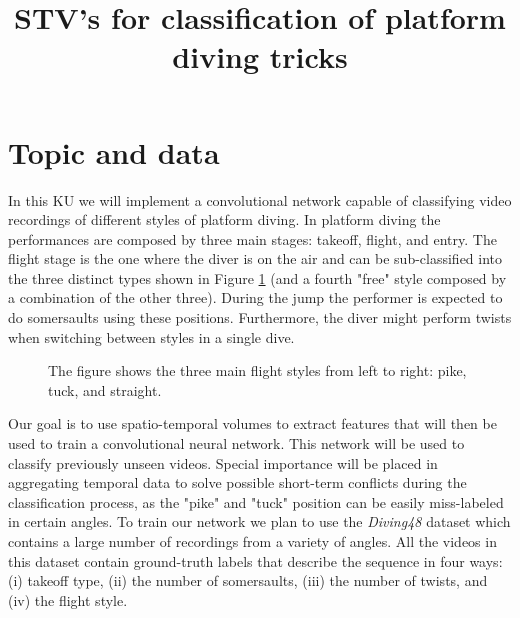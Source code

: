 \documentclass[10pt]{article}
\begin{document}
\noindent



\title{STV's for classification of platform diving tricks}


\maketitle

\section{Topic and data}

In this KU we will implement a convolutional network capable of classifying video recordings of different styles of platform diving. In platform diving the performances are composed by three main stages: takeoff, flight, and entry. The flight stage is the one where the diver is on the air and can be sub-classified into the three distinct types shown in Figure \ref{fig:dive-styles} (and a fourth "free" style composed by a combination of the other three). During the jump the performer is expected to do somersaults using these positions. Furthermore, the diver might perform twists when switching between styles in a single dive.

\begin{figure}[!htb]
\caption{\label{fig:dive-styles} The figure shows the three main flight styles from left to right: pike, tuck, and straight.}
\end{figure}

Our goal is to use spatio-temporal volumes to extract features that will then be used to train a convolutional neural network. This network will be used to classify previously unseen videos. Special importance will be placed in aggregating temporal data to solve possible short-term conflicts during the classification process, as the "pike" and "tuck" position can be easily miss-labeled in certain angles. To train our network we plan to use the \textit{Diving48} dataset \cite{ref-diving48} which contains a large number of recordings from a variety of angles. All the videos in this dataset contain ground-truth labels that describe the sequence in four ways: (i) takeoff type, (ii) the number of somersaults, (iii) the number of twists, and (iv) the flight style.
\end{document}
